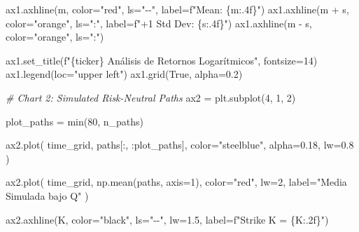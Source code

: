 \documentclass[
  11pt,
]{article}
\newenvironment{Shaded}{}{}
\newcommand{\BuiltInTok}[1]{\textcolor[rgb]{0.00,0.50,0.00}{#1}}
\newcommand{\CommentTok}[1]{\textcolor[rgb]{0.38,0.63,0.69}{\textit{#1}}}
\newcommand{\DecValTok}[1]{\textcolor[rgb]{0.25,0.63,0.44}{#1}}
\newcommand{\FloatTok}[1]{\textcolor[rgb]{0.25,0.63,0.44}{#1}}
\newcommand{\NormalTok}[1]{#1}
\newcommand{\OperatorTok}[1]{\textcolor[rgb]{0.40,0.40,0.40}{#1}}
\newcommand{\SpecialCharTok}[1]{\textcolor[rgb]{0.25,0.44,0.63}{#1}}
\newcommand{\SpecialStringTok}[1]{\textcolor[rgb]{0.73,0.40,0.53}{#1}}
\newcommand{\StringTok}[1]{\textcolor[rgb]{0.25,0.44,0.63}{#1}}
\newcommand{\VariableTok}[1]{\textcolor[rgb]{0.10,0.09,0.49}{#1}}
\begin{document}
\begin{Shaded}
\begin{Highlighting}[]
\NormalTok{ax1.axhline(m, color}\OperatorTok{=}\StringTok{"red"}\NormalTok{, ls}\OperatorTok{=}\StringTok{"{-}{-}"}\NormalTok{, label}\OperatorTok{=}\SpecialStringTok{f"Mean: }\SpecialCharTok{\{}\NormalTok{m}\SpecialCharTok{:.4f\}}\SpecialStringTok{"}\NormalTok{)}
\NormalTok{ax1.axhline(m }\OperatorTok{+}\NormalTok{ s, color}\OperatorTok{=}\StringTok{"orange"}\NormalTok{, ls}\OperatorTok{=}\StringTok{":"}\NormalTok{, label}\OperatorTok{=}\SpecialStringTok{f"+1 Std Dev: }\SpecialCharTok{\{}\NormalTok{s}\SpecialCharTok{:.4f\}}\SpecialStringTok{"}\NormalTok{)}
\NormalTok{ax1.axhline(m }\OperatorTok{{-}}\NormalTok{ s, color}\OperatorTok{=}\StringTok{"orange"}\NormalTok{, ls}\OperatorTok{=}\StringTok{":"}\NormalTok{)}

\NormalTok{ax1.set\_title(}\SpecialStringTok{f"}\SpecialCharTok{\{}\NormalTok{ticker}\SpecialCharTok{\}}\SpecialStringTok{ Análisis de Retornos Logarítmicos"}\NormalTok{, fontsize}\OperatorTok{=}\DecValTok{14}\NormalTok{)}
\NormalTok{ax1.legend(loc}\OperatorTok{=}\StringTok{"upper left"}\NormalTok{)}
\NormalTok{ax1.grid(}\VariableTok{True}\NormalTok{, alpha}\OperatorTok{=}\FloatTok{0.2}\NormalTok{)}

\CommentTok{\# Chart 2: Simulated Risk{-}Neutral Paths}
\NormalTok{ax2 }\OperatorTok{=}\NormalTok{ plt.subplot(}\DecValTok{4}\NormalTok{, }\DecValTok{1}\NormalTok{, }\DecValTok{2}\NormalTok{)}

\NormalTok{plot\_paths }\OperatorTok{=} \BuiltInTok{min}\NormalTok{(}\DecValTok{80}\NormalTok{, n\_paths)}

\NormalTok{ax2.plot(}
\NormalTok{    time\_grid,}
\NormalTok{    paths[:, :plot\_paths],}
\NormalTok{    color}\OperatorTok{=}\StringTok{"steelblue"}\NormalTok{,}
\NormalTok{    alpha}\OperatorTok{=}\FloatTok{0.18}\NormalTok{,}
\NormalTok{    lw}\OperatorTok{=}\FloatTok{0.8}
\NormalTok{)}

\NormalTok{ax2.plot(}
\NormalTok{    time\_grid,}
\NormalTok{    np.mean(paths, axis}\OperatorTok{=}\DecValTok{1}\NormalTok{),}
\NormalTok{    color}\OperatorTok{=}\StringTok{"red"}\NormalTok{,}
\NormalTok{    lw}\OperatorTok{=}\DecValTok{2}\NormalTok{,}
\NormalTok{    label}\OperatorTok{=}\StringTok{"Media Simulada bajo Q"}
\NormalTok{)}

\NormalTok{ax2.axhline(K, color}\OperatorTok{=}\StringTok{"black"}\NormalTok{, ls}\OperatorTok{=}\StringTok{"{-}{-}"}\NormalTok{, lw}\OperatorTok{=}\FloatTok{1.5}\NormalTok{, label}\OperatorTok{=}\SpecialStringTok{f"Strike K = }\SpecialCharTok{\{}\NormalTok{K}\SpecialCharTok{:.2f\}}\SpecialStringTok{"}\NormalTok{)}


\end{Highlighting}
\end{Shaded}
\end{document}
